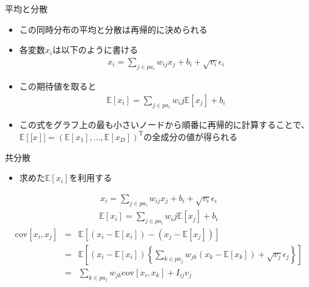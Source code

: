 \begin{frame}{平均と分散}
 \begin{itemize}
  \item この同時分布の平均と分散は再帰的に決められる
  \item 各変数$x_i$は以下のように書ける
        \begin{eqnarray*}
         x_i = \sum_{j \in pa_i}w_{ij}x_j + b_i + \sqrt{v_i}\epsilon_i
        \end{eqnarray*}
  \item この期待値を取ると
        \begin{eqnarray*}
         \mathbb{E}[x_i] = \sum_{j \in pa_i}w_ij\mathbb{E}[x_j]+b_i
        \end{eqnarray*}
  \item この式をグラフ上の最も小さいノードから順番に再帰的に計算することで、$\mathbb{E}[\mathrm[x]]=(\mathbb{E}[x_1], ... , \mathbb{E}[x_D])^{\mathrm{T}}$の全成分の値が得られる
 \end{itemize}
\end{frame}

\begin{frame}{共分散}
 \begin{itemize}
  \item 求めた$\mathbb{E}[x_i]$を利用する
 \end{itemize}
 \begin{eqnarray*}
  x_i = \sum_{j \in pa_i}w_{ij}x_j + b_i + \sqrt{v_i}\epsilon_i
 \end{eqnarray*}
 \begin{eqnarray*}
  \mathbb{E}[x_i] = \sum_{j \in pa_i}w_ij\mathbb{E}[x_j]+b_i
 \end{eqnarray*}
 \begin{eqnarray*}
  \mathrm{cov}[x_i, x_j] &=& \mathbb{E}[(x_i-\mathbb{E}[x_i])-(x_j-\mathbb{E}[x_j])]\\
  &= & \mathbb{E}\left[(x_i-\mathbb{E}[x_i])\left\{\sum_{k \in pa_j}w_{jk}(x_k-\mathbb{E}[x_k])+\sqrt{v_j}\epsilon_j \right\}\right]\\
  &= & \sum_{k \in pa_j}w_{jk}\mathrm{cov}[x_i,x_k]+I_{ij}v_j
 \end{eqnarray*}
\end{frame}
